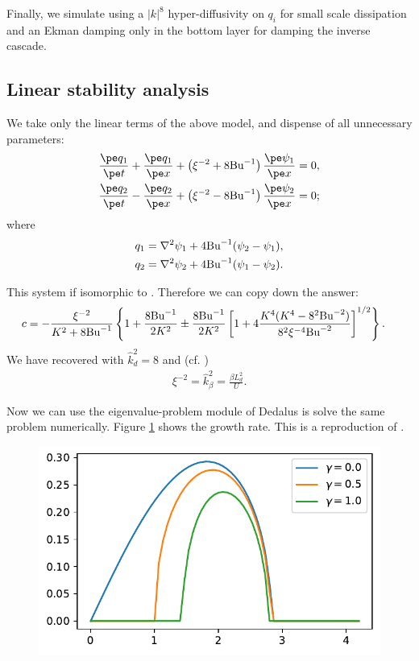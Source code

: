 Finally, we simulate using a $|k|^8$ hyper-diffusivity on $q_i$ for small scale dissipation and an Ekman damping only in the bottom layer for damping the inverse cascade.

\subsection{Linear stability analysis}
We take only the linear terms of the above model, and dispense of all unnecessary parameters:
\begin{align}
    &\frac{\pe q_1}{\pe t}+\frac{\pe q_1}{\pe x}+\left(\xi^{-2}+8\Bu^{-1}\right)\frac{\pe\psi_1}{\pe x} = 0,\label{eq:2lay_sym_eq1_lin}\\
    &\frac{\pe q_2}{\pe t}-\frac{\pe q_2}{\pe x}+\left(\xi^{-2}-8\Bu^{-1}\right)\frac{\pe\psi_2}{\pe x} = 0;\label{eq:2lay_sym_eq2_lin}
\end{align}
where
\begin{align}
    q_1 &= \nabla^2\psi_1 + 4\text{Bu}^{-1}(\psi_2-\psi_1),\label{eq:2lay_sym_pv1_lin}\\
    q_2 &= \nabla^2\psi_2 + 4\text{Bu}^{-1}(\psi_1-\psi_2).\label{eq:2lay_sym_pv2_lin}
\end{align}

This system if isomorphic to \cite[(9.107)]{Vallis_17}. Therefore we can copy down the answer:
\begin{align}
    c &= -\frac{\xi^{-2}}{K^2+8\text{Bu}^{-1}}\left\{ 1+\frac{8\text{Bu}^{-1}}{2K^2}\pm\frac{8\text{Bu}^{-1}}{2K^2}\left[1+4\frac{K^4(K^4-8^2\text{Bu}^{-2})}{8^2\xi^{-4}\text{Bu}^{-2}}\right]^{1/2} \right\}.
\end{align}
We have recovered \cite[(9.114)]{Vallis_17} with $\hat{k}_d^2 = 8$ and (cf. \cite[(9.115)]{Vallis_17})
\begin{align}
    \xi^{-2} = \hat{k}_\beta^2 = \frac{\beta L_d^2}{U}.
\end{align}

Now we can use the eigenvalue-problem module of Dedalus is solve the same problem numerically. Figure \ref{fig:2Lay_linstab} shows the growth rate. This is a reproduction of \cite[Fig. 9.14]{Vallis_17}.
\begin{figure}
    \centering
    \includegraphics{2Lay_linstab}
    \caption{}
    \label{fig:2Lay_linstab}
\end{figure}


